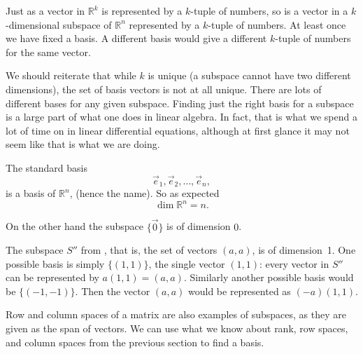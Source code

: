 Just as a vector in ${\mathbb R}^k$ is represented by a $k$-tuple of
numbers, so is a vector in a $k$-dimensional subspace of ${\mathbb R}^n$
represented by a $k$-tuple of numbers.  At least once we have fixed a basis.
A different basis would give a different $k$-tuple of numbers for the same
vector.

We should reiterate that while $k$ is unique (a subspace cannot have two different
dimensions), the set of basis vectors is not at all unique.  There are lots
of different bases for any given subspace.  Finding just the right basis for
a subspace is a large part of what one does in linear algebra.  In fact,
that is what we spend a lot of time on in
linear differential equations, although at first glance
it may not seem like that is what we are doing.

\begin{example}
The standard basis
\begin{equation*}
\vec{e}_1, \vec{e}_2, \ldots, \vec{e}_n ,
\end{equation*}
is a basis of ${\mathbb R}^n$, (hence the name).
So as expected
\begin{equation*}
\dim {\mathbb R}^n = n .
\end{equation*}

On the other hand the subspace $\{ \vec{0} \}$ is of dimension $0$.

The subspace $S''$ from , that is, the set of
vectors $(a,a)$, is of dimension~1.  One possible basis is simply
$\{ (1,1) \}$, the single
vector $(1,1)$: every vector in $S''$ can be represented by $a (1,1) =
(a,a)$.  Similarly another possible basis would be $\{ (-1,-1) \}$.  Then
the vector $(a,a)$ would be represented as $(-a) (1,1)$.
\end{example}

Row and column spaces of a matrix are also examples of
subspaces,
as they are given as the span of vectors.
We can use
what we know about rank, row spaces, and column spaces
from the previous section to find a basis.

